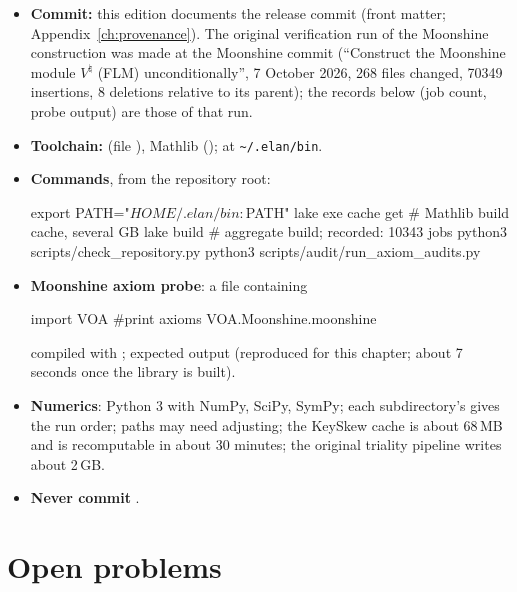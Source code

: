 \begin{itemize}
\item \textbf{Commit:} this edition documents the release commit \texttt{\bookcommit} (front matter;
  Appendix~\ref{ch:provenance}). The original verification run of the Moonshine construction was made at the Moonshine
  commit (``Construct the Moonshine module $V^\natural$ (FLM) unconditionally'', 7 October 2026, 268 files changed, 70349
  insertions, 8 deletions relative to its parent); the records below (job count, probe output) are those of that run.
\item \textbf{Toolchain:}  (file ), Mathlib
   ();  at \texttt{\textasciitilde/.elan/bin}.
\item \textbf{Commands}, from the repository root:
\begin{plaincode}
export PATH="$HOME/.elan/bin:$PATH"
lake exe cache get     # Mathlib build cache, several GB
lake build             # aggregate build; recorded: 10343 jobs
python3 scripts/check_repository.py
python3 scripts/audit/run_axiom_audits.py
\end{plaincode}
\item \textbf{Moonshine axiom probe}: a file containing
\begin{plaincode}
import VOA
#print axioms VOA.Moonshine.moonshine
\end{plaincode}
  compiled with ; expected output
  (reproduced for this chapter; about 7 seconds once the library is built).
\item \textbf{Numerics}: Python 3 with NumPy, SciPy, SymPy; each subdirectory's 
  gives the run order; paths may need adjusting; the KeySkew cache is about 68\,MB and is recomputable
  in about 30 minutes; the original triality pipeline writes about 2\,GB.
\item \textbf{Never commit} .
\end{itemize}

\section{Open problems}\label{ch15:sec:open}

